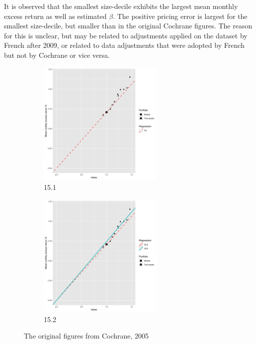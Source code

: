 \documentclass[]{article}
\begin{document}
It is observed that the smallest size-decile exhibits the largest mean monthly excess return as well as estimated $\beta$. The positive pricing error is largest for the smallest size-decile, but smaller than in the original Cochrane figures. The reason for this is unclear, but may be related to adjustments applied on the dataset by French after 2009, or related to data adjustments that were adopted by French but not by Cochrane or vice versa.

\begin{figure}[H]
	\begin{subfigure}{0.5\textwidth}
		\includegraphics[width=1\linewidth, height=6cm]{replicated_15_1} 
		\caption{15.1}
		\label{fig:subim3}
	\end{subfigure}
	\begin{subfigure}{0.5\textwidth}
		\includegraphics[width=1\linewidth, height=6cm]{replicated_15_2}
		\caption{15.2}
		\label{fig:subim4}
	\end{subfigure}	
	\caption{The original figures from Cochrane, 2005}
	\label{fig:image2}
\end{figure}
	
\end{document}
